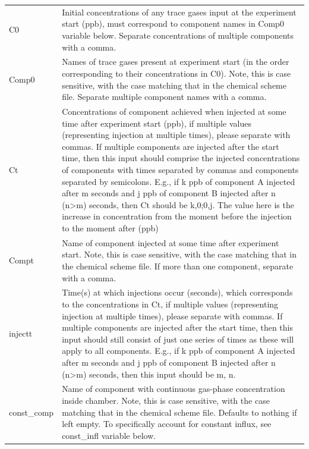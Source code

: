 \documentclass[gmd, manuscript]{copernicus}
\begin{document}
\begin{center}
\begin{supertabular}{p{0.15\textwidth}p{0.75\textwidth}}
C0 & Initial concentrations of any trace gases input at the experiment start (ppb), must correspond to component names in Comp0 variable below.  Separate concentrations of multiple components with a comma.  \\

Comp0 & Names of trace gases present at experiment start (in the order corresponding to their concentrations in C0).  Note, this is case sensitive, with the case matching that in the chemical scheme file.  Separate multiple component names with a comma. \\

Ct & Concentrations of component achieved when injected at some time after experiment start (ppb), if multiple values (representing injection at multiple times), please separate with commas.  If multiple components are  injected after the start time, then this input should comprise the injected concentrations of components with times separated by commas and components separated by semicolons.  E.g., if k ppb of component A injected after m seconds and j ppb of component B injected after n (n>m) seconds, then Ct should be k,0;0,j.  The value here is the increase in concentration from the moment before the injection to the moment after (ppb) \\

Compt & Name of component injected at some time after experiment start.  Note, this is case sensitive, with the case matching that in the chemical scheme file.  If more than one component, separate with a comma.  \\

injectt & Time(s) at which injections occur (seconds), which corresponds to the concentrations in Ct, if multiple values (representing injection at multiple times), please separate with commas.  If multiple components are  injected after the start time, then this input should still consist of just one series of times as these will apply to all components.  E.g., if k ppb of component A injected after m seconds and j ppb of component B injected after n (n>m) seconds, then this input should be m, n.\\

const\_comp & Name of component with continuous gas-phase concentration inside chamber.  Note, this is case sensitive, with the case matching that in the chemical scheme file.  Defaults to nothing if left empty.  To specifically account for constant influx, see const\_infl variable below.\\


\end{supertabular}
\end{center}
\end{document}
